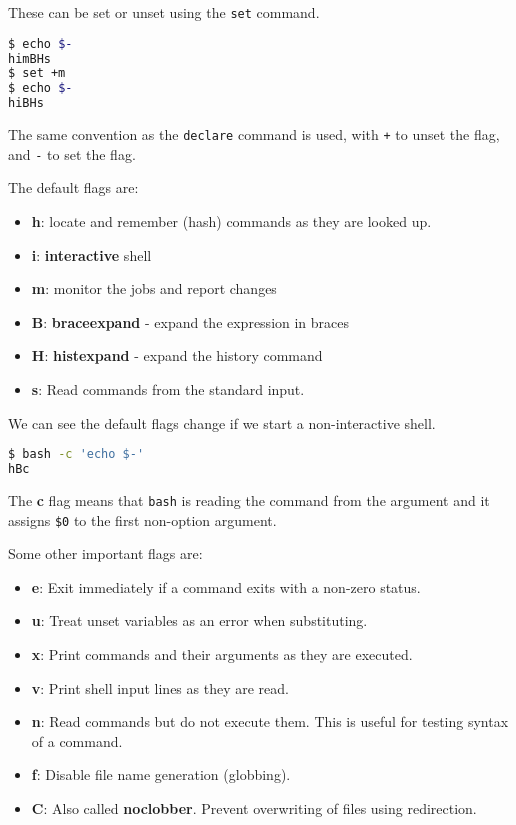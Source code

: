 These can be set or unset using the \lstinline{set} command.

\begin{lstlisting}[language=bash]
$ echo $-
himBHs
$ set +m
$ echo $-
hiBHs
\end{lstlisting}

The same convention as the \lstinline{declare} command is used, with \lstinline{+} to unset the flag, and \lstinline{-} to set the flag.

The default flags are:

\begin{itemize}
  \item
    \textbf{h}: locate and remember (hash) commands as they are looked up.
  \item
    \textbf{i}: \textbf{interactive} shell
  \item
    \textbf{m}: monitor the jobs and report changes
  \item
    \textbf{B}: \textbf{braceexpand} - expand the expression in braces
  \item
    \textbf{H}: \textbf{histexpand} - expand the history command
  \item
    \textbf{s}: Read commands from the standard input.
\end{itemize}

We can see the default flags change if we start a non-interactive shell.

\begin{lstlisting}[language=bash]
$ bash -c 'echo $-'
hBc
\end{lstlisting}

The \textbf{c} flag means that \lstinline{bash} is reading the command from the argument and it assigns \lstinline|$0| to the first non-option argument.

Some other important flags are:

\begin{itemize}
  \item
    \textbf{e}: Exit immediately if a command exits with a non-zero status.
  \item
    \textbf{u}: Treat unset variables as an error when substituting.
  \item
    \textbf{x}: Print commands and their arguments as they are executed.
  \item
    \textbf{v}: Print shell input lines as they are read.
  \item
    \textbf{n}: Read commands but do not execute them. This is useful for testing syntax of a command.
  \item
    \textbf{f}: Disable file name generation (globbing).
  \item
    \textbf{C}: Also called \textbf{noclobber}. Prevent overwriting of files using redirection.
\end{itemize}

